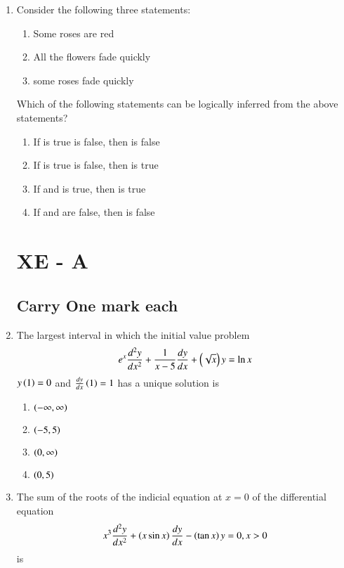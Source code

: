 \documentclass[journal]{IEEEtran}
\numberwithin{equation}{enumi}
\numberwithin{figure}{enumi}
\begin{document}
\begin{enumerate}
	\item 
	Consider the following three statements:
	\begin{enumerate}[label=\roman*]
		\item Some roses are red 
		\item All the flowers fade quickly
		\item some roses fade quickly
	\end{enumerate}
	Which of the following statements can be logically inferred from the above statements?

	\hfill{}
	\begin{enumerate}
		\item If  is true  is false, then  is false
		\item If  is true  is false, then  is true	
		\item If  and  is true, then  is true
		\item If  and  are false, then  is false
	\end{enumerate}

\section{XE - A}
\subsection{Carry One mark each}
	\item 
	The largest interval in which the initial value problem 
	\begin{align*}
		e^x \frac{d^2y}{dx^2} + \frac{1}{x - 5}\frac{dy}{dx} + \left(\sqrt{x}\right)y = \ln{x}
	\end{align*}
	$y\left(1\right) = 0$ and $\frac{dy}{dx}\left(1\right) = 1$ has a unique solution is 

	\hfill{}
	\begin{multicols}{4}
		\begin{enumerate}
			 \item $\left(-\infty,\infty\right)$
			 \item $\left(-5,5\right)$
			 \item $\left(0,\infty\right)$
			 \item $\left(0,5\right)$
		\end{enumerate}
	\end{multicols}

	\item 
	The sum of the roots of the indicial equation at $x = 0$ of the differential equation
	\begin{align*}
		x^3 \frac{d^2y}{dx^2} + \left(x\sin{x}\right)\frac{dy}{dx} - \left(\tan{x}\right)y = 0, x > 0
	\end{align*}
	is 


\end{enumerate}
\end{document}
